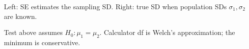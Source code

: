 \documentclass{article}
\begin{document}
\begin{posterpage}
{  \begin{minipage}[t]{9.8in}
  \end{minipage}\par\vspace{.2in}
  {\fontsize{25pt}{31pt}\selectfont Left: SE estimates the sampling SD. Right: true SD when population SDs \(\sigma_1,\sigma_2\) are known.}\par
  \vspace{.12in}
  \begin{minipage}[t]{9.8in}
  \end{minipage}\hfill
  \begin{minipage}[t]{9.8in}
  \end{minipage}\par\vspace{.2in}
  {\fontsize{25pt}{31pt}\selectfont Test above assumes \(H_0:\mu_1=\mu_2\). Calculator df is Welch's approximation; the minimum is conservative.}
}


\end{posterpage}
\end{document}
